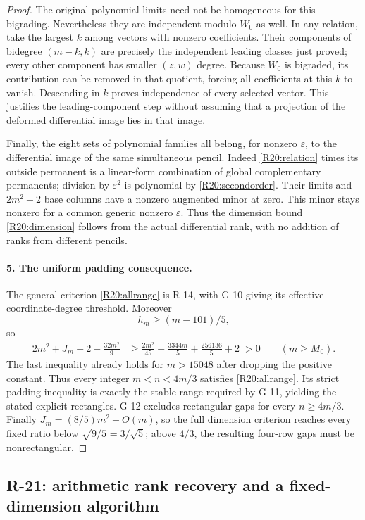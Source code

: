\documentclass[11pt,a4paper]{article}
\theoremstyle{definition}\newtheorem{definition}{Definition}
\begin{document}
\begin{proof}
The original polynomial limits need not be homogeneous for this
bigrading. Nevertheless they are independent modulo $W_0$ as well.
In any relation, take the largest $k$ among vectors with nonzero
coefficients. Their components of bidegree $(m-k,k)$ are precisely
the independent leading classes just proved; every other component
has smaller $(z,w)$ degree. Because $W_0$ is bigraded, its contribution
can be removed in that quotient, forcing all coefficients at this
$k$ to vanish. Descending in $k$ proves independence of every
selected vector. This justifies the leading-component step without
assuming that a projection of the deformed differential image lies
in that image.

Finally, the eight sets of polynomial families all belong, for
nonzero $\varepsilon$, to the differential image of the same
simultaneous pencil. Indeed \eqref{R20:relation} times its outside
permanent is a linear-form combination of global complementary
permanents; division by $\varepsilon^2$ is polynomial by
\eqref{R20:secondorder}. Their limits and $2m^2+2$ base columns
have a nonzero augmented minor at zero. This minor stays nonzero
for a common generic nonzero $\varepsilon$. Thus the dimension
bound \eqref{R20:dimension} follows from the actual differential
rank, with no addition of ranks from different pencils.

\paragraph{5. The uniform padding consequence.}
The general criterion \eqref{R20:allrange} is R-14, with G-10
giving its effective coordinate-degree threshold. Moreover
\[
 h_m\geq(m-101)/5,
\]
so
\begin{align*}
 2m^2+J_m+2-\frac{32m^2}{9}
 &\geq \frac{2m^2}{45}-\frac{3344m}{5}
                  +\frac{256136}{5}+2\;>0
 \qquad(m\geq M_0).
\end{align*}
The last inequality already holds for $m>15048$ after dropping
the positive constant. Thus every integer $m<n<4m/3$ satisfies
\eqref{R20:allrange}. Its strict padding inequality is exactly
the stable range required by G-11, yielding the stated explicit
rectangles. G-12 excludes rectangular gaps for every $n\geq4m/3$.
Finally $J_m=(8/5)m^2+O(m)$, so the full dimension criterion reaches
every fixed ratio below $\sqrt{9/5}=3/\sqrt5$; above $4/3$, the
resulting four-row gaps must be nonrectangular.
\end{proof}


\subsection{R-21: arithmetic rank recovery and a fixed-dimension algorithm}
\end{document}
